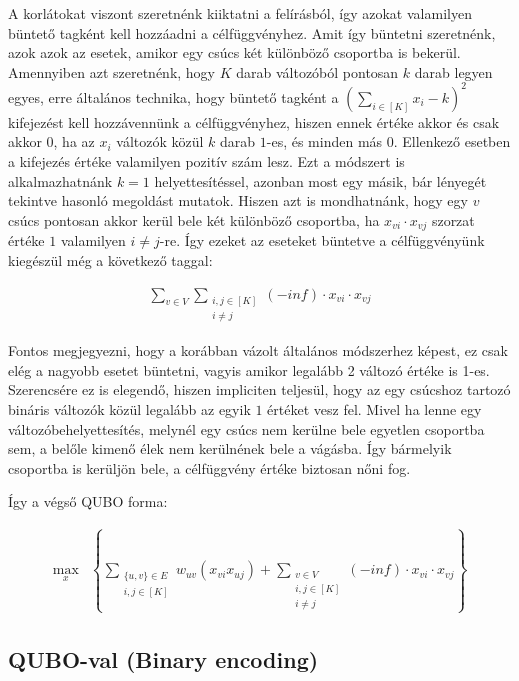 A korlátokat viszont szeretnénk kiiktatni a felírásból, így azokat valamilyen büntető tagként kell hozzáadni a célfüggvényhez. Amit így büntetni szeretnénk, azok azok az esetek, amikor egy csúcs két különböző csoportba is bekerül. Amennyiben azt szeretnénk, hogy $K$ darab változóból pontosan $k$ darab legyen egyes, erre általános technika, hogy büntető tagként a $(\sum _{i \in [K]} x_i - k)^2 $ kifejezést kell hozzávennünk a célfüggvényhez, hiszen ennek értéke akkor és csak akkor $0$, ha az $x_i$ változók közül $k$ darab $1$-es, és minden más $0$. Ellenkező esetben a kifejezés értéke valamilyen pozitív szám lesz. Ezt a módszert is alkalmazhatnánk $k=1$ helyettesítéssel, azonban most egy másik, bár lényegét tekintve hasonló megoldást mutatok. Hiszen azt is mondhatnánk, hogy egy $v$ csúcs pontosan akkor kerül bele két különböző csoportba, ha $x_{vi}\cdot x_{vj}$ szorzat értéke $1$ valamilyen $i \neq j$-re. Így ezeket az eseteket büntetve a célfüggvényünk kiegészül még a következő taggal:

\begin{align} \sum _{v \in V } \sum _{\substack{ i,j \in [K] \\  i \neq j}} (-inf) \cdot x_{vi} \cdot x_{vj}
\end{align}

Fontos megjegyezni, hogy a korábban vázolt általános módszerhez képest, ez csak elég a nagyobb esetet büntetni, vagyis amikor legalább 2 változó értéke is 1-es. Szerencsére ez is elegendő, hiszen impliciten teljesül, hogy az egy csúcshoz tartozó bináris változók közül legalább az egyik $1$ értéket vesz fel. Mivel ha lenne egy változóbehelyettesítés, melynél egy csúcs nem kerülne bele egyetlen csoportba sem, a belőle kimenő élek nem kerülnének bele a vágásba. Így bármelyik csoportba is kerüljön bele, a célfüggvény értéke biztosan nőni fog.

Így a végső QUBO forma:

\begin{align} 
	\max_{x} & \left\{\sum _{\substack{\{u,v\} \in E \\ i,j \in [K]}} w_{uv}(x_{vi}  x_{uj}) + \sum _{\substack{v \in V \\ i,j \in [K] \\  i \neq j}} (-inf) \cdot x_{vi} \cdot x_{vj}\right\} 
\end{align}



\subsection{QUBO-val (Binary encoding)}

